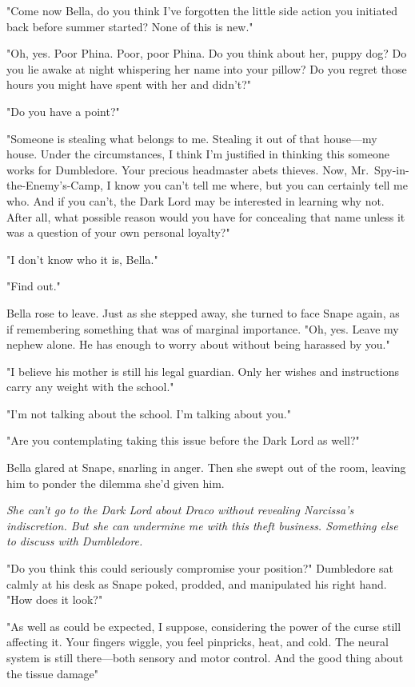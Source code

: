 "Come now Bella, do you think I've forgotten the little side action you initiated back before summer started? None of this is new."

"Oh, yes. Poor Phina. Poor, poor Phina. Do you think about her, puppy dog? Do you lie awake at night whispering her name into your pillow? Do you regret those hours you might have spent with her and didn't?"

"Do you have a point?"

"Someone is stealing what belongs to me. Stealing it out of that house—my house. Under the circumstances, I think I'm justified in thinking this someone works for Dumbledore. Your precious headmaster abets thieves. Now, Mr.~Spy-in-the-Enemy's-Camp, I know you can't tell me where, but you can certainly tell me who. And if you can't, the Dark Lord may be interested in learning why not. After all, what possible reason would you have for concealing that name{\el} unless it was a question of your own personal loyalty?"

"I don't know who it is, Bella."

"Find out."

Bella rose to leave. Just as she stepped away, she turned to face Snape again, as if remembering something that was of marginal importance. "Oh, yes. Leave my nephew alone. He has enough to worry about without being harassed by you."

"I believe his mother is still his legal guardian. Only her wishes and instructions carry any weight with the school."

"I'm not talking about the school. I'm talking about you."

"Are you contemplating taking this issue before the Dark Lord as well?"

Bella glared at Snape, snarling in anger. Then she swept out of the room, leaving him to ponder the dilemma she'd given him.

\emph{She can't go to the Dark Lord about Draco without revealing Narcissa's indiscretion. But she can undermine me with this theft business. Something else to discuss with Dumbledore.}

\sbreak

"Do you think this could seriously compromise your position?" Dumbledore sat calmly at his desk as Snape poked, prodded, and manipulated his right hand. "How does it look?"

"As well as could be expected, I suppose, considering the power of the curse still affecting it. Your fingers wiggle, you feel pinpricks, heat, and cold. The neural system is still there—both sensory and motor control. And the good thing about the tissue damage{\el}"

